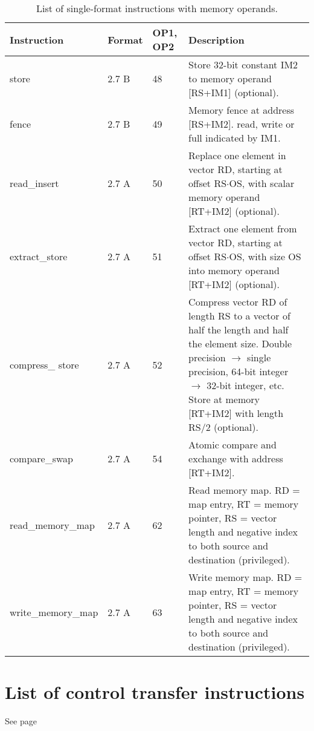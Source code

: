 \documentclass[forwardcom.tex]{subfiles}
\begin{document}
\begin{longtable} {|p{20mm}|p{10mm}|p{8mm}|p{75mm}|}
\caption{List of single-format instructions with memory operands.} 
\label{table:ListOfSingleFormatInstructionsMemory} \\
\endfirsthead
\endhead
\hline
\bfseries Instruction & \bfseries Format &\bfseries OP1, OP2 & \bfseries Description \\
\hline
store         & 2.7 B & 48 & Store 32-bit constant IM2 to memory operand [RS+IM1] (optional). \\

fence         & 2.7 B & 49 & Memory fence at address [RS+IM2]. read, write or full indicated by IM1.\\

read\_insert  & 2.7 A & 50 & Replace one element in vector RD, starting at offset 
RS$\cdot$OS, with scalar memory operand [RT+IM2] (optional).  \\

extract\_store& 2.7 A & 51 & Extract one element from vector RD, starting at offset RS$\cdot$OS, with size OS into memory operand [RT+IM2] (optional). \\

compress\_ store& 2.7 A & 52 & Compress vector RD of length RS to a vector of half the length and half the element size. Double precision $\rightarrow$ single precision, 64-bit integer $\rightarrow$ 32-bit integer, etc. Store at memory [RT+IM2] with length RS/2 (optional).\\

compare\_swap     & 2.7 A & 54 & Atomic compare and exchange with address [RT+IM2].\\

read\_memory\_\newline map  & 2.7 A & 62 & Read memory map. RD = map entry, RT = memory pointer, RS = vector length and negative index to both source and destination (privileged). \\
write\_memory\_\newline map & 2.7 A & 63 & Write memory map. RD = map entry, RT = memory pointer, RS = vector length and negative index to both source and destination (privileged). \\

\hline
\end{longtable}


\section{List of control transfer instructions}
See page \pageref{table:controlTransferInstructions}
\end{document}
